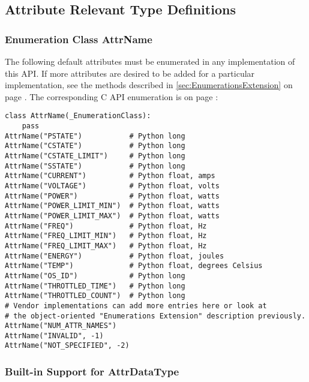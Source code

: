 \documentclass[12pt]{report} %
\begin{document}
\begin{appendices}
\subsection{Attribute Relevant Type Definitions}
\label{sec:PythonAttributeRelevantTypeDefinitions}

\subsubsection{Enumeration Class AttrName}\label{class:AttrName}

The following default attributes must be enumerated in any implementation of
this API. If more attributes are desired to be added for a particular
implementation, see the methods described in \ref{sec:EnumerationsExtension} on
page \pageref{sec:EnumerationsExtension}. The corresponding C API enumeration
is on page \pageref{type:AttrName}:

\begin{center}\begin{minipage}{.95\linewidth}\begin{lstlisting}
class AttrName(_EnumerationClass):
    pass
AttrName("PSTATE")           # Python long
AttrName("CSTATE")           # Python long
AttrName("CSTATE_LIMIT")     # Python long
AttrName("SSTATE")           # Python long
AttrName("CURRENT")          # Python float, amps
AttrName("VOLTAGE")          # Python float, volts
AttrName("POWER")            # Python float, watts
AttrName("POWER_LIMIT_MIN")  # Python float, watts
AttrName("POWER_LIMIT_MAX")  # Python float, watts
AttrName("FREQ")             # Python float, Hz
AttrName("FREQ_LIMIT_MIN")   # Python float, Hz
AttrName("FREQ_LIMIT_MAX")   # Python float, Hz
AttrName("ENERGY")           # Python float, joules 
AttrName("TEMP")             # Python float, degrees Celsius
AttrName("OS_ID")            # Python long
AttrName("THROTTLED_TIME")   # Python long
AttrName("THROTTLED_COUNT")  # Python long
# Vendor implementations can add more entries here or look at  
# the object-oriented "Enumerations Extension" description previously. 
AttrName("NUM_ATTR_NAMES")
AttrName("INVALID", -1)
AttrName("NOT_SPECIFIED", -2)
\end{lstlisting}\end{minipage}\end{center}

\subsubsection{Built-in Support for AttrDataType}
\label{sec:PythonPwrAttrDataType}


\end{appendices}
\end{document}
